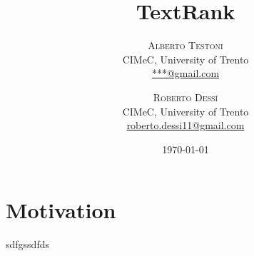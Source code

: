 \documentclass[twoside,twocolumn]{article}
\title{TextRank} %
\author{%
	\textsc{Alberto Testoni }\\ [1ex]%
\normalsize CIMeC, University of Trento \\ %
\normalsize \href{mailto:***@gmail.com}{***@gmail.com} %
\and %
\textsc{Roberto Dess\'{i} } \\[1ex] %
\normalsize  CIMeC, University of Trento\\ %
\normalsize \href{mailto:roberto.dessi11@gmail.com}{roberto.dessi11@gmail.com} %
}
\date{\today} %
\begin{document}
\maketitle


\section{Motivation}
sdfgssdfds \cite{systematic}








\end{document}
